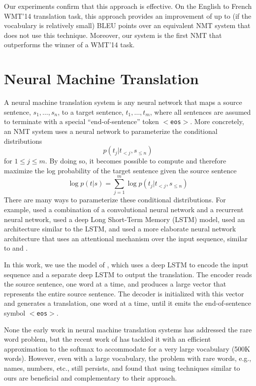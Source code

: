 \documentclass[11pt]{article}
\newcommand{\edit}[1]{{#1}} \newcommand{\hide}[1]{}
\newcommand{\eossym}{$<$\texttt{eos}$>$}
\begin{document}
Our experiments confirm that this approach is effective. On the English to French WMT'14
translation task, this approach provides an improvement of
up to \bestunkimp{} (if the vocabulary is relatively small) 
BLEU points over an equivalent NMT system that does not use this technique.
Moreover, our system is the first NMT that outperforms the winner of a WMT'14 task.


 
\section{Neural Machine Translation}
\label{sec:nmt}

A neural machine translation system is any neural network that maps a source 
sentence, $s_1,\ldots,s_n$,
to a target sentence, $t_1,\ldots,t_m$, where all sentences are assumed to 
terminate with a special
``end-of-sentence'' token \eossym{}.  More concretely, an NMT system uses a neural 
network to parameterize the conditional distributions
\begin{equation}
p(t_j|t_{<j},s_{\leq n})
\end{equation}
for $1\leq j \leq m$.  By doing so, it becomes possible to 
compute and therefore maximize the log probability
of the target sentence given the source sentence
\begin{equation}
\log p(t|s) = \sum_{j=1}^m  \log p\left(t_j|t_{<j},s_{\leq n}\right)
\end{equation}
There are many ways to parameterize these conditional distributions.
For example,  used a combination of a
convolutional neural network and a recurrent neural network,  used a deep Long Short-Term Memory
(LSTM) model,  used an architecture similar to the LSTM, and
 used a more elaborate neural network
architecture that uses an attentional mechanism over the input sequence, 
similar to  and .  

In this work, we use the model of , which 
uses a deep LSTM to encode the input sequence and a separate deep LSTM 
to output the translation. The encoder reads the 
source sentence, one word at a time, and produces
a large vector that represents the entire source sentence. 
The decoder is initialized with this vector
and generates a translation, one word at a time, 
until it emits the end-of-sentence symbol \eossym{}.

None the early work in neural machine translation systems has addressed the rare word problem,
but the recent work of  has tackled it with 
\edit{an efficient approximation to the softmax to accommodate for a very large vocabulary (500K words). However, even with a large vocabulary, the problem with rare words, e.g., names, numbers, etc., still persists, and \newcite{jean15} found that using techniques similar to ours are beneficial and complementary to their approach.}
 
\end{document}

